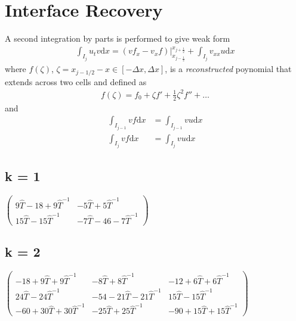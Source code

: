 \documentclass[final]{siamltex}
\begin{document}
\section{Interface Recovery}
  A second integration by parts is performed to give weak form
  \begin{align*}
    \int_{I_j} u_t v \mathrm{d}x 
    =
    \left(vf_x - v_xf\right) \bigr|_{x_{j-\frac{1}{2}}}^{x_{j+\frac{1}{2}}}
    +
    \int_{I_j}v_{xx}u\mathrm{d}x
  \end{align*}
  where $f(\zeta)$, $\zeta=x_{j-1/2}-x \in [-\Delta x,\Delta x]$, is a
  \emph{reconstructed} poynomial that extends across two cells
  and defined as
  \begin{align*}
    f(\zeta) = f_0 + \zeta f' + \frac{1}{2}\zeta^2 f'' + \ldots
  \end{align*}
  and
  \begin{align*}
    \int_{I_{j-1}} v f \mathrm{d}x &= \int_{I_{j-1}} v u \mathrm{d}x \\
    \int_{I_{j}} v f \mathrm{d}x &= \int_{I_{j}} v u \mathrm{d}x
  \end{align*}
  
  
  
  \subsection{k = 1}
  $\left(\begin{array}{cc}
      9\hat{T}-18+9\hat{T}^{-1} & -5\hat{T} + 5\hat{T}^{-1} \\
      15 \hat{T} -15 \hat{T}^{-1} & -7 \hat{T} - 46 - 7\hat{T}^{-1}
    \end{array}\right)$
    
  \subsection{k = 2}
  $\left(
\begin{array}{ccc}
 -18+9 \hat{T}+9 \hat{T}^{-1} & -8 \hat{T}+8 \hat{T}^{-1} & -12+6 \hat{T}+6 \hat{T}^{-1} \\
 24 \hat{T}-24 \hat{T}^{-1} & -54-21 \hat{T}-21 \hat{T}^{-1} & 15 \hat{T}-15 \hat{T}^{-1} \\
 -60+30 \hat{T}+30 \hat{T}^{-1} & -25 \hat{T}+25 \hat{T}^{-1} & -90+15 \hat{T}+15 \hat{T}^{-1}
\end{array}
\right)$





\end{document}
